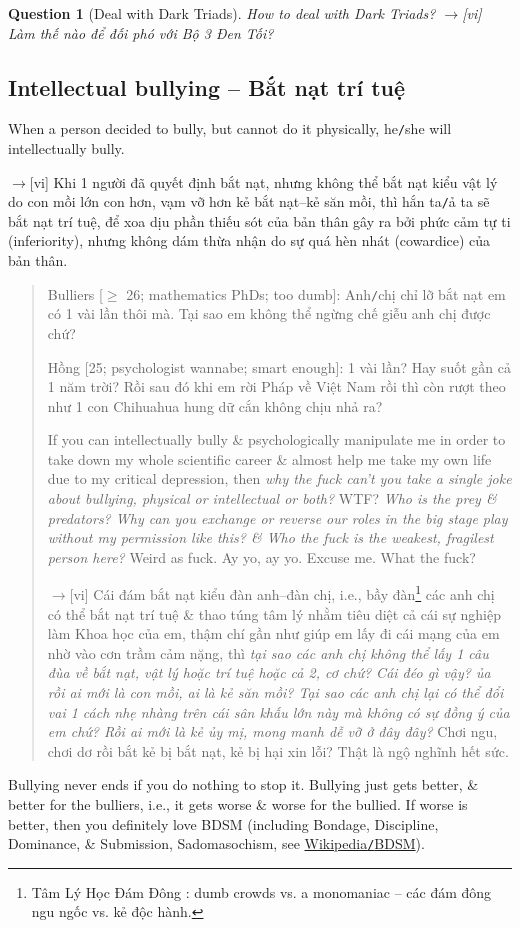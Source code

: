 \documentclass[12pt,twoside]{book}
\newtheorem{question}{Question}
\begin{document}
\begin{question}[Deal with Dark Triads]
	How to deal with Dark Triads? {\sf[en]$\to$[vi]} Làm thế nào để đối phó với Bộ 3 Đen Tối?
\end{question}

\subsection{Intellectual bullying -- Bắt nạt trí tuệ}
When a person decided to bully, but cannot do it physically, he{\tt/}she will intellectually bully.

{\sf[en]$\to$[vi]} Khi 1 người đã quyết định bắt nạt, nhưng không thể bắt nạt kiểu vật lý do con mồi lớn con hơn, vạm vỡ hơn kẻ bắt nạt--kẻ săn mồi, thì hắn ta{\tt/}ả ta sẽ bắt nạt trí tuệ, để xoa dịu phần thiếu sót của bản thân gây ra bởi phức cảm tự ti (inferiority), nhưng không dám thừa nhận do sự quá hèn nhát (cowardice) của bản thân.

\begin{quote}
	{\sf Bulliers [$\ge$ 26; mathematics PhDs; too dumb]}: Anh{\tt/}chị chỉ lỡ bắt nạt em có 1 vài lần thôi mà. Tại sao em không thể ngừng chế giễu anh chị được chứ?
	
	{\sf Hồng [25; psychologist wannabe; smart enough]}: 1 vài lần? Hay suốt gần cả 1 năm trời? Rồi sau đó khi em rời Pháp về Việt Nam rồi thì còn rượt theo như 1 con Chihuahua hung dữ cắn không chịu nhả ra?
	
	If you can intellectually bully \& psychologically manipulate me in order to take down my whole scientific career \& almost help me take my own life due to my critical depression, then {\it why the fuck can't you take a single joke about bullying, physical or intellectual or both?} WTF? {\it Who is the prey \& predators? Why can you exchange or reverse our roles in the big stage play without my permission like this? \&  Who the fuck is the weakest, fragilest person here?} Weird as fuck. Ay yo, ay yo. Excuse me. What the fuck?
	
	{\sf[en]$\to$[vi]} Cái đám bắt nạt kiểu đàn anh--đàn chị, i.e., bầy đàn\footnote{Tâm Lý Học Đám Đông \cite{Bon_crowd_psychology,Bon_crowd_psychology_VN}: dumb crowds vs. a monomaniac -- các đám đông ngu ngốc vs. kẻ độc hành.} các anh chị có thể bắt nạt trí tuệ \& thao túng tâm lý nhằm tiêu diệt cả cái sự nghiệp làm Khoa học của em, thậm chí gần như giúp em lấy đi cái mạng của em nhờ vào cơn trầm cảm nặng, thì {\it tại sao các anh chị không thể lấy 1 câu đùa về bắt nạt, vật lý hoặc trí tuệ hoặc cả 2, cơ chứ? Cái đéo gì vậy? ủa rồi ai mới là con mồi, ai là kẻ săn mồi? Tại sao các anh chị lại có thể đổi vai 1 cách nhẹ nhàng trên cái sân khấu lớn này mà không có sự đồng ý của em chứ? Rồi ai mới là kẻ ủy mị, mong manh dễ vỡ ở đây đây?} Chơi ngu, chơi dơ rồi bắt kẻ bị bắt nạt, kẻ bị hại xin lỗi? Thật là ngộ nghĩnh hết sức.
\end{quote}
Bullying never ends if you do nothing to stop it. Bullying just gets better, \& better for the bulliers, i.e., it gets worse \& worse for the bullied. If worse is better, then you definitely love BDSM (including Bondage, Discipline, Dominance, \& Submission, Sadomasochism, see \href{https://en.wikipedia.org/wiki/BDSM}{Wikipedia{\tt/}BDSM}).
\end{document}
